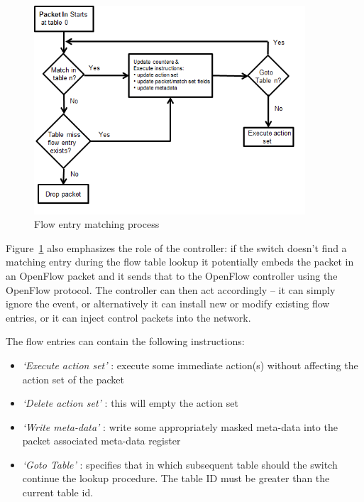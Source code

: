 \documentclass{article}
\begin{document}
\begin{figure}[!htb]
    \centering
    \includegraphics[width=0.9\textwidth]{figures/openflow-processing-flowchart.png}
    \caption{Flow entry matching process}
    \label{fig:OpenFlow-matching-process}
\end{figure}

Figure~\ref{fig:OpenFlow-matching-process} also emphasizes the role of the controller: if the switch doesn't find a
matching entry during the flow table lookup it potentially embeds the packet in an OpenFlow packet and it sends that to
the OpenFlow controller using the OpenFlow protocol. The controller can then act accordingly -- it can simply ignore
the event, or alternatively it can install new	or modify existing flow entries, or it can inject control packets into
the network.

The flow entries can contain the following instructions:
\begin{itemize}
    \item \emph{`Execute action set'} : execute some immediate action(s) without affecting the action set of the
          packet
    \item \emph{`Delete action set'} : this will empty the action set
    \item \emph{`Write meta-data'} : write some appropriately masked meta-data into the packet associated meta-data
          register
    \item \emph{`Goto Table'} : specifies that in which subsequent table should the switch continue the lookup
          procedure. The table ID must be greater than the current table id.
\end{itemize}
\end{document}
